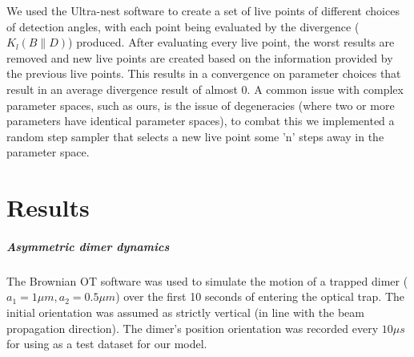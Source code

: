 \documentclass[11pt]{article}
\begin{document}
	We used the Ultra-nest software to create a set of live points of different choices of detection angles, with each point being evaluated by the divergence ($K_l(B\parallel D)$) produced. After evaluating every live point, the worst results are removed and new live points are created based on the information provided by the previous live points. This results in a convergence on parameter choices that result in an average divergence result of almost 0. A common issue with complex parameter spaces, such as ours, is the issue of degeneracies (where two or more parameters have identical parameter spaces), to combat this we implemented a random step sampler that selects a new live point some 'n' steps away in the parameter space.
	
	\section*{Results}
	\subparagraph*{Asymmetric dimer dynamics}
	The Brownian OT software was used to simulate the motion of a trapped dimer ($a_1=1\mu m, a_2=0.5\mu m$) over the first 10 seconds of entering the optical trap. The initial orientation was assumed as strictly vertical (in line with the beam propagation direction). The dimer's position orientation was recorded every $10 \mu s$ for using as a test dataset for our model. 
	
\end{document}
